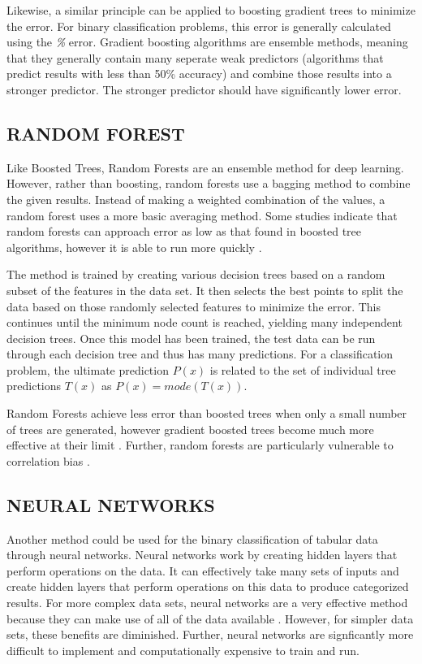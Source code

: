 \documentclass[12pt]{article}
\begin{document}
    Likewise, a similar principle can be applied to boosting gradient trees to minimize the error. For binary classification problems, this error is generally calculated using the \textit{\%} error. Gradient boosting algorithms are ensemble methods, meaning that they generally contain many seperate weak predictors (algorithms that predict results with less than 50\% accuracy) and combine those results into a stronger predictor. The stronger predictor should have significantly lower error.

    \subsection{RANDOM FOREST}
      Like Boosted Trees, Random Forests are an ensemble method for deep learning. However, rather than boosting, random forests use a bagging method to combine the given results. Instead of making a weighted combination of the values, a random forest uses a more basic averaging method. Some studies indicate that random forests can approach error as low as that found in boosted tree algorithms, however it is able to run more quickly \cite{friedman2001elements}.

      The method is trained by creating various decision trees based on a random subset of the features in the data set. It then selects the best points to split the data based on those randomly selected features to minimize the error. This continues until the minimum node count is reached, yielding many independent decision trees. Once this model has been trained, the test data can be run through each decision tree and thus has many predictions. For a classification problem, the ultimate prediction $P(x)$ is related to the set of individual tree predictions $T(x)$ as $P(x) = mode(T(x))$.

      Random Forests achieve less error than boosted trees when only a small number of trees are generated, however gradient boosted trees become much more effective at their limit \cite{friedman2001elements}. Further, random forests are particularly vulnerable to correlation bias \cite{randomforest1}.

    \subsection{NEURAL NETWORKS}
      Another method could be used for the binary classification of tabular data through neural networks. Neural networks work by creating hidden layers that perform operations on the data. It can effectively take many sets of inputs and create hidden layers that perform operations on this data to produce categorized results. For more complex data sets, neural networks are a very effective method because they can make use of all of the data available \cite{neuralnets2}. However, for simpler data sets, these benefits are diminished. Further, neural networks are signficantly more difficult to implement and computationally expensive to train and run.
\end{document}
